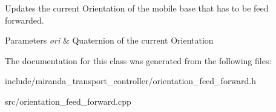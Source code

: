 Updates the current Orientation of the mobile base that has to be feed forwarded. 


\begin{DoxyParams}{Parameters}
{\em ori} & Quaternion of the current Orientation \\
\hline
\end{DoxyParams}


The documentation for this class was generated from the following files\+:\begin{DoxyCompactItemize}
\item 
include/miranda\+\_\+transport\+\_\+controller/orientation\+\_\+feed\+\_\+forward.\+h\item 
src/orientation\+\_\+feed\+\_\+forward.\+cpp\end{DoxyCompactItemize}
